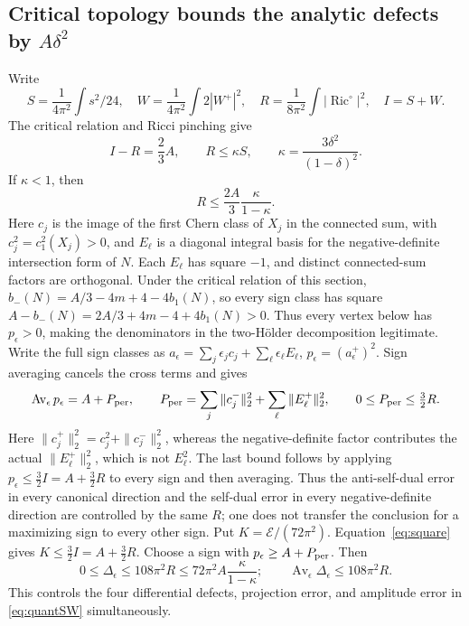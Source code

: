 \documentclass[a4paper,11pt]{article}
\numberwithin{equation}{section}
\theoremstyle{definition}
\newcommand{\Ric}{\operatorname{Ric}}
\begin{document}
\subsection{Critical topology bounds the analytic defects by $A\delta^2$}
Write
\[
S=\frac1{4\pi^2}\int s^2/24,\quad
W=\frac1{4\pi^2}\int2|W^+|^2,\quad
R=\frac1{8\pi^2}\int|\Ric^\circ|^2,\quad I=S+W.
\]
The critical relation and Ricci pinching give
\[
I-R=\frac23A,\qquad R\le\kappa S,\qquad
\kappa=\frac{3\delta^2}{(1-\delta)^2}.
\]
If $\kappa<1$, then
\begin{equation}\label{eq:Rmax}
R\le\frac{2A}{3}\frac{\kappa}{1-\kappa}.
\end{equation}
Here $c_j$ is the image of the first Chern class of $X_j$ in the connected sum, with
$c_j^2=c_1^2(X_j)>0$, and $E_\ell$ is a diagonal integral basis for the negative-definite intersection form of $N$.
Each $E_\ell$ has square $-1$, and distinct connected-sum factors are orthogonal. Under the critical relation of this section,
$b_-(N)=A/3-4m+4-4b_1(N)$, so every sign class has square
$A-b_-(N)=2A/3+4m-4+4b_1(N)>0$. Thus every vertex below has
$p_\epsilon>0$, making the denominators in the two-H\"older decomposition legitimate. Write the full sign classes as
$a_\epsilon=\sum_j\epsilon_jc_j+\sum_\ell\epsilon_\ell E_\ell$,
$p_\epsilon=(a_\epsilon^+)^2$. Sign averaging cancels the cross terms and gives
\[
\operatorname{Av}_\epsilon p_\epsilon
=A+P_{\rm per},\qquad
P_{\rm per}=\sum_j\|c_j^-\|_2^2+\sum_\ell\|E_\ell^+\|_2^2,\qquad
0\le P_{\rm per}\le\tfrac32R.
\]
Here $\|c_j^+\|_2^2=c_j^2+\|c_j^-\|_2^2$, whereas the negative-definite factor contributes the actual
$\|E_\ell^+\|_2^2$, which is not $E_\ell^2$.
The last bound follows by applying
$p_\epsilon\le\tfrac32I=A+\tfrac32R$ to every sign and then averaging.
Thus the anti-self-dual error in every canonical direction and the self-dual error in every negative-definite direction are controlled by the same $R$;
one does not transfer the conclusion for a maximizing sign to every other sign.
Put $K=\mathcal E/(72\pi^2)$. Equation~\eqref{eq:square} gives
$K\le\tfrac32I=A+\tfrac32R$.
Choose a sign with $p_\epsilon\ge A+P_{\rm per}$. Then
\[
0\le\Delta_\epsilon\le108\pi^2R
\le72\pi^2A\frac{\kappa}{1-\kappa};
\qquad
\operatorname{Av}_\epsilon\Delta_\epsilon\le108\pi^2R.
\]
This controls the four differential defects, projection error, and amplitude error in \eqref{eq:quantSW} simultaneously.
\end{document}
